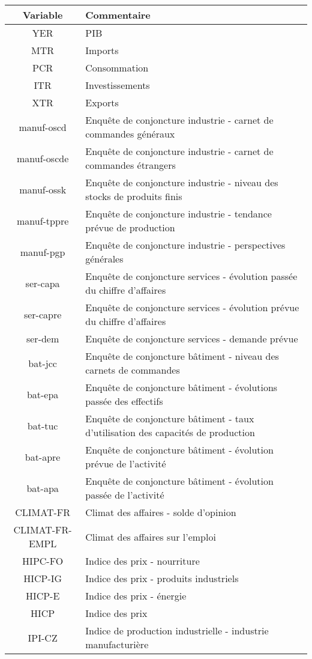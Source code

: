 \documentclass[10pt,french,french]{article}
\begin{document}
\begin{center}
   \begin{tabular}{ | c | l | }
     \hline
     \textbf{Variable} & \textbf{Commentaire} \\ \hline
     YER & PIB\\ \hline
     MTR & Imports \\ \hline
     PCR & Consommation\\ \hline
     ITR & Investissements \\ \hline
     XTR & Exports \\ \hline
     manuf-oscd & Enquête de conjoncture industrie -  carnet de commandes généraux \\ \hline
     manuf-oscde & Enquête de conjoncture industrie - carnet de commandes étrangers \\ \hline
     manuf-ossk & Enquête de conjoncture industrie - niveau des stocks de produits finis\\ \hline
     manuf-tppre & Enquête de conjoncture industrie - tendance prévue de production\\ \hline
     manuf-pgp & Enquête de conjoncture industrie - perspectives générales\\ \hline
     ser-capa & Enquête de conjoncture services - évolution passée du chiffre d'affaires\\ \hline
     ser-capre & Enquête de conjoncture services - évolution prévue du chiffre d'affaires\\ \hline
     ser-dem & Enquête de conjoncture services - demande prévue \\ \hline
     bat-jcc & Enquête de conjoncture bâtiment - niveau des carnets de commandes \\ \hline
     bat-epa & Enquête de conjoncture bâtiment - évolutions passée des effectifs\\ \hline
     bat-tuc & Enquête de conjoncture bâtiment - taux d'utilisation des capacités de production\\ \hline
     bat-apre & Enquête de conjoncture bâtiment -  évolution prévue de l'activité\\ \hline
     bat-apa & Enquête de conjoncture bâtiment - évolution passée de l'activité \\ \hline
     CLIMAT-FR & Climat des affaires - solde d'opinion\\ \hline
     CLIMAT-FR-EMPL & Climat des affaires sur l'emploi \\ \hline
     HIPC-FO & Indice des prix - nourriture \\ \hline
     HICP-IG & Indice des prix - produits industriels \\ \hline
     HICP-E & Indice des prix - énergie \\ \hline
     HICP & Indice des prix \\ \hline
     IPI-CZ & Indice de production industrielle - industrie manufacturière\\
     \hline
   \end{tabular}
   \label{tableau_var}
 \end{center}
\end{document}
